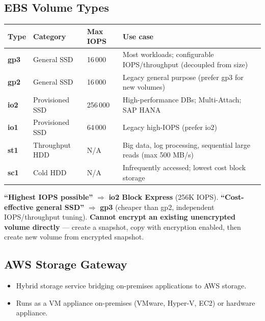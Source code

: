 
\subsection{EBS Volume Types}

\begin{comparebox}[title={EBS volume type selection}]
\begin{tabular}{@{}p{2.5cm}p{2.5cm}p{2.5cm}p{4cm}@{}}
\toprule
\textbf{Type} & \textbf{Category} & \textbf{Max IOPS} & \textbf{Use case} \\
\midrule
\textbf{gp3}  & General SSD & 16\,000 & Most workloads; configurable IOPS/throughput (decoupled from size) \\[3pt]
\textbf{gp2}  & General SSD & 16\,000 & Legacy general purpose (prefer gp3 for new volumes) \\[3pt]
\textbf{io2}  & Provisioned SSD & 256\,000 & High-performance DBs; Multi-Attach; SAP HANA \\[3pt]
\textbf{io1}  & Provisioned SSD & 64\,000 & Legacy high-IOPS (prefer io2) \\[3pt]
\textbf{st1}  & Throughput HDD & N/A & Big data, log processing, sequential large reads (max 500 MB/s) \\[3pt]
\textbf{sc1}  & Cold HDD & N/A & Infrequently accessed; lowest cost block storage \\
\bottomrule
\end{tabular}
\end{comparebox}

\begin{examtip}
\textbf{``Highest IOPS possible''} $\Rightarrow$ \textbf{io2 Block Express} (256K IOPS).
\textbf{``Cost-effective general SSD''} $\Rightarrow$ \textbf{gp3} (cheaper than gp2, independent IOPS/throughput tuning).
\textbf{Cannot encrypt an existing unencrypted volume directly} --- create a snapshot, copy with encryption enabled, then create new volume from encrypted snapshot.
\end{examtip}


\subsection{AWS Storage Gateway}

\begin{keyfacts}
\begin{itemize}
  \item Hybrid storage service bridging on-premises applications to AWS storage.
  \item Runs as a VM appliance on-premises (VMware, Hyper-V, EC2) or hardware appliance.
\end{itemize}
\end{keyfacts}

